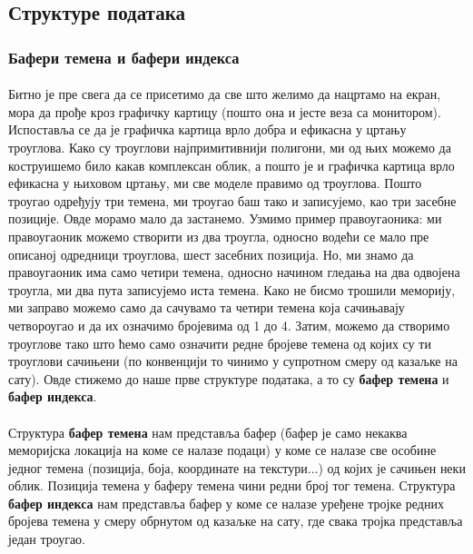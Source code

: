 \documentclass[12pt]{article}
\begin{document}
	\subsection{Структуре података}
	
	\subsubsection{Бафери темена и бафери индекса}
	\paragraph{}
	Битно је пре свега да се присетимо да све што желимо да нацртамо на екран, мора да прође кроз графичку картицу (пошто она и јесте веза са монитором). Испоставља се да је графичка картица врло добра и ефикасна у цртању троуглова. Како су троуглови најпримитивнији полигони, ми од њих можемо да коструишемо било какав комплексан облик, а пошто је и графичка картица врло ефикасна у њиховом цртању, ми све моделе правимо од троуглова. Пошто троугао одређују три темена, ми троугао баш тако и записујемо, као три засебне позиције. Овде морамо мало да застанемо. Узмимо пример правоугаоника: ми правоугаоник можемо створити из два троугла, односно водећи се мало пре описаној одредници троуглова, шест засебних позиција. Но, ми знамо да правоугаоник има само четири темена, односно начином гледања на два одвојена троугла,  ми два пута записујемо иста темена. Како не бисмо трошили меморију, ми заправо можемо само да сачувамо та четири темена која сачињавају четвороугао и да их означимо бројевима од 1 до 4. Затим, можемо да створимо троуглове тако што ћемо само означити редне бројеве темена од којих су ти троуглови сачињени (по конвенцији то чинимо у супротном смеру од казаљке на сату). Овде стижемо до наше прве структуре података, а то су \textbf{бафер темена} и \textbf{бафер индекса}.
	\paragraph{}
	Структура \textbf{бафер темена} нам представља бафер (бафер је само некаква меморијска локација на коме се налазе подаци) у коме се налазе све особине једног темена (позиција, боја, координате на текстури...) од којих је сачињен неки облик. Позиција темена у баферу темена чини редни број тог темена. Структура \textbf{бафер индекса} нам представља бафер у коме се налазе уређене тројке редних бројева темена у смеру обрнутом од казаљке на сату, где свака тројка представља један троугао.
	
\end{document}
